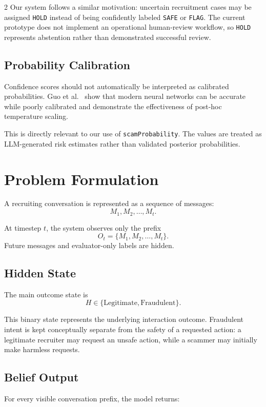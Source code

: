 \documentclass{article}
\begin{document}
\begin{multicols}{2}
Our system follows a similar motivation: uncertain recruitment cases may be assigned \texttt{HOLD} instead of being confidently labeled \texttt{SAFE} or \texttt{FLAG}. The current prototype does not implement an operational human-review workflow, so \texttt{HOLD} represents abstention rather than demonstrated successful review.

\subsection{Probability Calibration}

Confidence scores should not automatically be interpreted as calibrated probabilities. Guo et al.~\cite{guo2017calibration} show that modern neural networks can be accurate while poorly calibrated and demonstrate the effectiveness of post-hoc temperature scaling.

This is directly relevant to our use of \texttt{scamProbability}. The values are treated as LLM-generated risk estimates rather than validated posterior probabilities.

\section{Problem Formulation}

A recruiting conversation is represented as a sequence of messages:
\[
M_1, M_2, \ldots, M_t.
\]

At timestep $t$, the system observes only the prefix
\[
O_t = \{M_1, M_2, \ldots, M_t\}.
\]
Future messages and evaluator-only labels are hidden.

\subsection{Hidden State}

The main outcome state is
\[
H \in \{\text{Legitimate}, \text{Fraudulent}\}.
\]

This binary state represents the underlying interaction outcome. Fraudulent intent is kept conceptually separate from the safety of a requested action: a legitimate recruiter may request an unsafe action, while a scammer may initially make harmless requests.

\subsection{Belief Output}

For every visible conversation prefix, the model returns:


\end{multicols}
\end{document}
